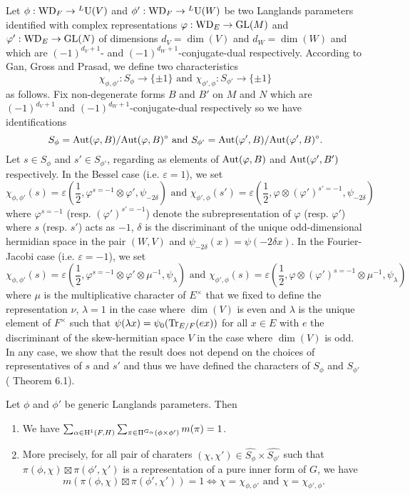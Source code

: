 Let $\phi: \mathrm{WD}_F \to {}^L \mathrm{U}(V)$ and $\phi': \mathrm{WD}_F \to {}^L \mathrm{U}(W)$ be two Langlands parameters identified with complex representations $\varphi: \mathrm{WD}_E \to \mathrm{GL}(M)$ and $\varphi': \mathrm{WD}_E \to \mathrm{GL}(N)$ of dimensions $d_V = \dim(V)$ and $d_W = \dim(W)$ and which are $(-1)^{d_V + 1}$- and $(-1)^{d_W + 1}$-conjugate-dual respectively.
According to Gan, Gross and Prasad, we define two characteristics
\[
    \chi_{\phi, \phi'}: S_\phi \to \{ \pm 1\}\text{ and } \chi_{\phi', \phi}:S_{\phi'} \to \{\pm1\}
\]
as follows.
Fix non-degenerate forms $B$ and $B'$ on $M$ and $N$ which are $(-1)^{d_V + 1}$ and $(-1)^{d_W + 1}$-conjugate-dual respectively so we have identifications
\[
    S_\phi = \mathrm{Aut}(\varphi, B) / \mathrm{Aut}(\varphi, B)^\circ \text{ and } S_{\phi'} = \mathrm{Aut}(\varphi', B) / \mathrm{Aut}(\varphi', B)^\circ.
\]
Let $s \in S_\phi$ and $s' \in S_{\phi'}$, regarding as elements of $\mathrm{Aut}(\varphi, B)$ and $\mathrm{Aut}(\varphi', B')$ respectively.
In the Bessel case (i.e. $\varepsilon = 1$), we set
\[
    \chi_{\phi, \phi'}(s) = \varepsilon\left(\frac{1}{2}, \varphi^{s = -1} \otimes \varphi', \psi_{-2\delta}\right) \text{ and } \chi_{\phi', \phi}(s') = \varepsilon\left(\frac{1}{2}, \varphi \otimes (\varphi')^{s' = -1}, \psi_{-2\delta}\right)
\]
where $\varphi^{s=-1}$ (resp. $(\varphi')^{s' = -1}$) denote the subrepresentation of $\varphi$ (resp. $\varphi'$) where $s$ (resp. $s'$) acts as $-1$, $\delta$ is the discriminant of the unique odd-dimensional hermidian space in the pair $(W, V)$ and $\psi_{-2\delta}(x) = \psi(-2\delta x)$.
In the Fourier-Jacobi case (i.e. $\varepsilon = -1$), we set
\[
    \chi_{\phi, \phi'}(s) = \varepsilon\left(\frac{1}{2}, \varphi^{s = -1} \otimes \varphi' \otimes \mu^{-1}, \psi_\lambda\right) \text{ and } \chi_{\phi', \phi}(s) = \varepsilon\left(\frac{1}{2}, \varphi \otimes (\varphi')^{s=-1} \otimes \mu^{-1}, \psi_\lambda\right)
\]
where $\mu$ is the multiplicative character of $E^\times$ that we fixed to define the representation $\nu$, $\lambda = 1$ in the case where $\dim(V)$ is even and $\lambda$ is the unique element of $F^\times$ such that $\psi(\lambda x) = \psi_0(\mathrm{Tr}_{E/F}(ex))$ for all $x \in E$ with $e$ the discriminant of the skew-hermitian space $V$ in the case where $\dim(V)$ is odd.
In any case, we show that the result does not depend on the choices of representatives of $s$ and $s'$ and thus we have defined the characters of $S_\phi$ and $S_{\phi'}$ (\cite{gan2011symplectic} Theorem 6.1).


\begin{conjecture}
Let $\phi$ and $\phi'$ be generic Langlands parameters.
Then
\begin{enumerate}
    \item We have $\sum_{\alpha \in \mathrm{H}^1(F, H)} \sum_{\pi \in \Pi^{G_\alpha}(\phi \times \phi')} m(\pi) = 1$.
    \item More precisely, for all pair of charaters $(\chi, \chi') \in \widehat{S_\phi} \times \widehat{S_{\phi'}}$ such that $\pi(\phi, \chi) \boxtimes \pi(\phi', \chi')$ is a representation of a pure inner form of $G$, we have
    \[
        m(\pi(\phi, \chi) \boxtimes \pi(\phi', \chi')) = 1 \Leftrightarrow \chi = \chi_{\phi, \phi'}\text{ and }\chi = \chi_{\phi', \phi}.
    \]
\end{enumerate}
\end{conjecture}
